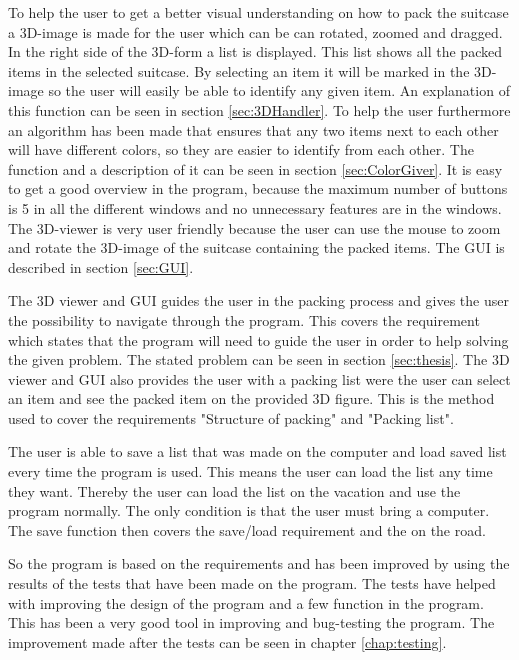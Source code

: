To help the user to get a better visual understanding on how to pack the suitcase a 3D-image is made for the user which can be can rotated, zoomed and dragged. In the right side of the 3D-form a list is displayed. This list shows all the packed items in the selected suitcase. By selecting an item it will be marked in the 3D-image so the user will easily be able to identify any given item. An explanation of this function can be seen in section \ref{sec:3DHandler}. To help the user furthermore an algorithm has been made that ensures that any two items next to each other will have different colors, so they are easier to identify from each other. The function and a description of it can be seen in section \ref{sec:ColorGiver}.
It is easy to get a good overview in the program, because the maximum number of buttons is 5 in all the different windows and no unnecessary features are in the windows. The 3D-viewer is very user friendly because the user can use the mouse to zoom and rotate the 3D-image of the suitcase containing the packed items. The GUI is described in section \ref{sec:GUI}.

The 3D viewer and GUI guides the user in the packing process and gives the user the possibility to navigate through the program. This covers the requirement which states that the program will need to guide the user in order to help solving the given problem. The stated problem can be seen in section \ref{sec:thesis}. The 3D viewer and GUI also provides the user with a packing list were the user can select an item and see the packed item on the provided 3D figure. This is the method used to cover the requirements "Structure of packing" and "Packing list".

The user is able to save a list that was made on the computer and load saved list every time the program is used. This means the user can load the list any time they want. Thereby the user can load the list on the vacation and use the program normally. The only condition is that the user must bring a computer. The save function then covers the save/load requirement and the on the road.

So the program is based on the requirements and has been improved by using the results of the tests that have been made on the program. The tests have helped with improving the design of the program and a few function in the program. This has been a very good tool in improving and bug-testing the program. The improvement made after the tests can be seen in chapter \ref{chap:testing}.

